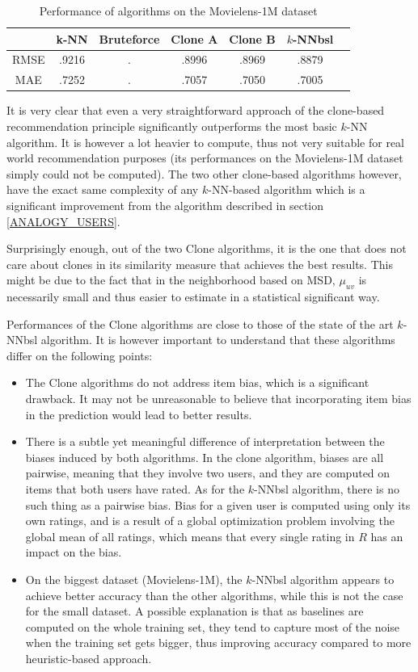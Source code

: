 \begin{table}[!ht]
\centering
\caption{Performance of algorithms on the Movielens-1M dataset}
\label{table:res1M}
\begin{tabular}{| c || c | c | c | c | c | c |}
  \toprule
     &  k-NN & Bruteforce & Clone A & Clone B & $k$-NNbsl\\
  \midrule
RMSE & .9216 &           .&   .8996 &  .8969  &  .8879\\
MAE  & .7252 &           .&   .7057 &  .7050  &  .7005\\
\bottomrule
\end{tabular}
\end{table}

It is very clear that even a very straightforward approach of the clone-based
recommendation principle significantly outperforms the most basic $k$-NN
algorithm. It is however a lot heavier to compute, thus not very suitable for
real world recommendation purposes (its performances on the Movielens-1M
dataset simply could not be computed). The two other clone-based algorithms
however, have the exact same complexity of any $k$-NN-based algorithm which is
a significant improvement from the algorithm described in section
\ref{ANALOGY_USERS}.

Surprisingly enough, out of the two Clone algorithms, it is the one that does
not care about clones in its similarity measure that achieves the best results.
This might be due to the fact that in the neighborhood based on MSD, $\mu_{uv}$
is necessarily small and thus easier to estimate in a statistical significant
way.

Performances of the Clone algorithms are close to those of the state of the
art $k$-NNbsl algorithm. It is however important to understand that these
algorithms differ on the following points:
\begin{itemize}
\item The Clone algorithms do not address item bias, which is a significant
  drawback. It may not be unreasonable to believe that incorporating item bias
  in the prediction would lead to better results.
\item There is a subtle yet meaningful difference of interpretation between the
  biases induced by both algorithms. In the clone algorithm, biases are all
  pairwise, meaning that they involve two users, and they are computed on items
  that both users have rated. As for the $k$-NNbsl algorithm, there is no such
  thing as a pairwise bias. Bias for a given user is computed using only its
  own ratings, and is a result of a global optimization problem involving the
  global mean of all ratings, which means that every single rating in $R$ has
  an impact on the bias.
\item On the biggest dataset (Movielens-1M), the $k$-NNbsl algorithm appears to
  achieve better accuracy than the other algorithms, while this is not the case
  for the small dataset. A possible explanation is that as baselines are
  computed on the whole training set, they tend to capture most of the noise
  when the training set gets bigger, thus improving accuracy compared to more
  heuristic-based approach.
\end{itemize}


